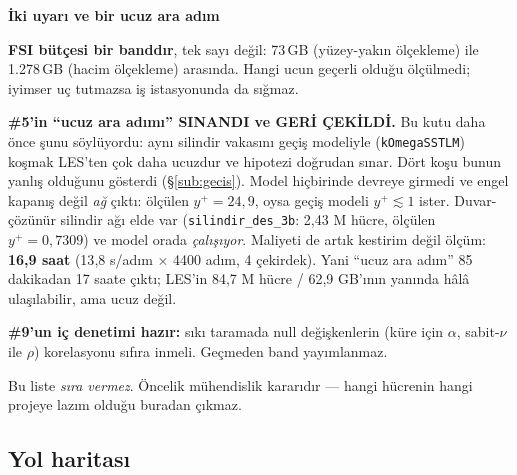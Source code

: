 \documentclass[11pt,a4paper]{article}
\newcommand{\kkkenar}{lacivert}
\newcommand{\kkzemin}{kod}
\newenvironment{renkkutu}[3]{%
  \renewcommand{\kkkenar}{#1}\renewcommand{\kkzemin}{#2}%
  \par\medskip\noindent
  \begin{lrbox}{\kutugovde}%
  \begin{minipage}{\dimexpr\linewidth-2\fboxsep-2\fboxrule\relax}\footnotesize
  \textcolor{#1}{\textbf{#3}}\par\vspace{3pt}%
}{%
  \end{minipage}%
  \end{lrbox}%
  \noindent\fcolorbox{\kkkenar}{\kkzemin}{\usebox{\kutugovde}}%
  \par\medskip
}
\newenvironment{dikkat}[1]{\begin{renkkutu}{orta}{ortabg}{#1}}{\end{renkkutu}}
\begin{document}
\begin{dikkat}{İki uyarı ve bir ucuz ara adım}
\textbf{FSI bütçesi bir banddır}, tek sayı değil: 73\,GB (yüzey-yakın
ölçekleme) ile 1.278\,GB (hacim ölçekleme) arasında. Hangi ucun geçerli
olduğu ölçülmedi; iyimser uç tutmazsa iş istasyonunda da sığmaz.

\textbf{\#5'in ``ucuz ara adımı'' SINANDI ve GERİ ÇEKİLDİ.} Bu kutu daha
önce şunu söylüyordu: aynı silindir vakasını geçiş modeliyle
(\texttt{kOmegaSSTLM}) koşmak LES'ten çok daha ucuzdur ve hipotezi doğrudan
sınar. Dört koşu bunun yanlış olduğunu gösterdi (\S\ref{sub:gecis}). Model
hiçbirinde devreye girmedi ve engel kapanış değil \emph{ağ} çıktı: ölçülen
$y^+ = 24{,}9$, oysa geçiş modeli $y^+ \!\lesssim\! 1$ ister. Duvar-çözünür
silindir ağı elde var (\texttt{silindir\_des\_3b}: 2{,}43 M hücre, ölçülen
$y^+ = 0{,}7309$) ve model orada \emph{çalışıyor}. Maliyeti de artık
kestirim değil ölçüm: \textbf{16{,}9 saat} (13{,}8 s/adım $\times$ 4400 adım,
4 çekirdek). Yani ``ucuz ara adım'' 85 dakikadan 17 saate çıktı; LES'in
84{,}7 M hücre / 62{,}9 GB'ının yanında hâlâ ulaşılabilir, ama ucuz değil.

\textbf{\#9'un iç denetimi hazır:} sıkı taramada null değişkenlerin
(küre için $\alpha$, sabit-$\nu$ ile $\rho$) korelasyonu sıfıra inmeli.
Geçmeden band yayımlanmaz.
\end{dikkat}

\noindent Bu liste \emph{sıra vermez}. Öncelik mühendislik kararıdır ---
hangi hücrenin hangi projeye lazım olduğu buradan çıkmaz.

\subsection{Yol haritası}
\end{document}
